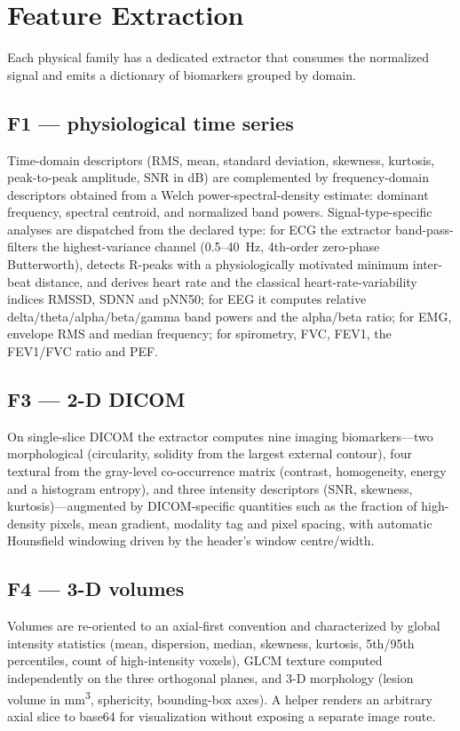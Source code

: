\documentclass[10pt,twocolumn]{article}
\begin{document}
\section{Feature Extraction}
Each physical family has a dedicated extractor that consumes the normalized
signal and emits a dictionary of biomarkers grouped by domain.

\subsection{F1 --- physiological time series}
Time-domain descriptors (RMS, mean, standard deviation, skewness, kurtosis,
peak-to-peak amplitude, SNR in dB) are complemented by frequency-domain
descriptors obtained from a Welch power-spectral-density estimate: dominant
frequency, spectral centroid, and normalized band powers. Signal-type-specific
analyses are dispatched from the declared type: for ECG the extractor
band-pass-filters the highest-variance channel (0.5--40~Hz, 4th-order
zero-phase Butterworth), detects R-peaks with a physiologically motivated
minimum inter-beat distance, and derives heart rate and the classical
heart-rate-variability indices RMSSD, SDNN and pNN50; for EEG it computes
relative delta/theta/alpha/beta/gamma band powers and the alpha/beta ratio; for
EMG, envelope RMS and median frequency; for spirometry, FVC, FEV1, the
FEV1/FVC ratio and PEF.

\subsection{F3 --- 2-D DICOM}
On single-slice DICOM the extractor computes nine imaging biomarkers---two
morphological (circularity, solidity from the largest external contour), four
textural from the gray-level co-occurrence matrix (contrast, homogeneity,
energy and a histogram entropy), and three intensity descriptors (SNR,
skewness, kurtosis)---augmented by DICOM-specific quantities such as the
fraction of high-density pixels, mean gradient, modality tag and pixel spacing,
with automatic Hounsfield windowing driven by the header's window
centre/width.

\subsection{F4 --- 3-D volumes}
Volumes are re-oriented to an axial-first convention and characterized by global
intensity statistics (mean, dispersion, median, skewness, kurtosis, 5th/95th
percentiles, count of high-intensity voxels), GLCM texture computed
independently on the three orthogonal planes, and 3-D morphology (lesion volume
in mm\textsuperscript{3}, sphericity, bounding-box axes). A helper renders an
arbitrary axial slice to base64 for visualization without exposing a separate
image route.
\end{document}
